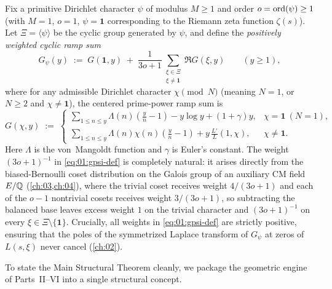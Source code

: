 Fix a primitive Dirichlet character $\psi$ of modulus $M \ge 1$ and order $o = \operatorname{ord}(\psi) \ge 1$ (with $M = 1$, $o = 1$, $\psi = \mathbf{1}$ corresponding to the Riemann zeta function $\zeta(s)$). Let $\Xi = \langle \psi \rangle$ be the cyclic group generated by $\psi$, and define the \emph{positively weighted cyclic ramp sum}
\begin{equation}
\label{eq:01:gpsi-def}
  G_\psi(y) \;:=\; G(\mathbf{1}, y) \;+\; \frac{1}{3o + 1} \sum_{\substack{\xi \in \Xi \\ \xi \neq \mathbf{1}}} \Re G(\xi, y) \qquad (y \ge 1),
\end{equation}
where for any admissible Dirichlet character $\chi \pmod{N}$ (meaning $N = 1$, or $N \ge 2$ and $\chi \neq \mathbf{1}$), the centered prime-power ramp sum is
\begin{equation}
\label{eq:01:gchi-def}
  G(\chi, y) \;:=\;
  \begin{cases}
    \displaystyle \sum_{1 \le n \le y} \Lambda(n)\!\left(\frac{y}{n} - 1\right) - y\log y + (1 + \gamma)y, & \chi = \mathbf{1}\ (N = 1), \\[10pt]
    \displaystyle \sum_{1 \le n \le y} \Lambda(n)\chi(n)\!\left(\frac{y}{n} - 1\right) + y\,\frac{L'}{L}(1, \chi), & \chi \neq \mathbf{1}.
  \end{cases}
\end{equation}
Here $\Lambda$ is the von~Mangoldt function and $\gamma$ is Euler's constant. The weight $(3o+1)^{-1}$ in \eqref{eq:01:gpsi-def} is completely natural: it arises directly from the biased-Bernoulli coset distribution on the Galois group of an auxiliary CM field $E/\mathbb{Q}$ (\cref{ch:03,ch:04}), where the trivial coset receives weight $4/(3o+1)$ and each of the $o-1$ nontrivial cosets receives weight $3/(3o+1)$, so subtracting the balanced base leaves excess weight $1$ on the trivial character and $(3o+1)^{-1}$ on every $\xi \in \Xi \setminus \{\mathbf{1}\}$. Crucially, all weights in \eqref{eq:01:gpsi-def} are strictly positive, ensuring that the poles of the symmetrized Laplace transform of $G_\psi$ at zeros of $L(s,\xi)$ never cancel (\cref{ch:02}).

To state the Main Structural Theorem cleanly, we package the geometric engine of Parts~II--VI into a single structural concept.

